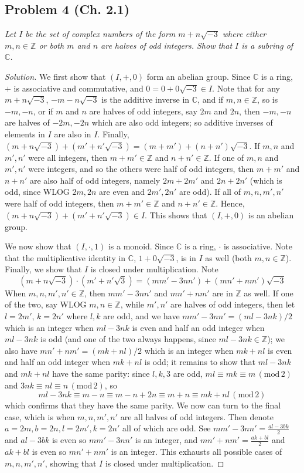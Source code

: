 \documentclass{article}
\newcommand{\Z}{{\mathbb Z}}
\newcommand{\C}{{\mathbb C}}
\begin{document}
\subsection*{Problem 4 (Ch. 2.1)}
{\it Let $I$ be the set of complex numbers of the form
$m + n\sqrt{-3}$ where either $m,n\in\Z$ or both
$m$ and $n$ are halves of odd integers.
Show that $I$ is a subring of $\C$.}
\begin{proof}[Solution]\let\qed\relax
	We first show that $(I,+,0)$ form an abelian group.
	Since $\C$ is a ring, $+$ is associative and commutative,
	and $0 = 0 + 0\sqrt{-3} \in I$.
	Note that for any $m + n\sqrt{-3}$, $-m - n\sqrt{-3}$ is the additive inverse in $\C$,
	and if $m,n \in \Z$, so is $-m,-n$,
	or if $m$ and $n$ are halves of odd integers, say $2m$ and $2n$,
	then $-m,-n$ are halves of $-2m,-2n$ which are also odd integers;
	so additive inverses of elements in $I$ are also in $I$.
	Finally, $(m + n\sqrt{-3}) + (m' + n'\sqrt{-3}) = (m + m') + (n + n')\sqrt{-3}$.
	If $m,n$ and $m',n'$ were all integers,
	then $m + m' \in \Z$ and $n + n' \in \Z$.
	If one of $m,n$ and $m',n'$ were integers,
	and so the others were half of odd integers,
	then $m + m'$ and $n + n'$ are also half of odd integers,
	namely $2m+2m'$ and $2n+2n'$
	(which is odd, since WLOG $2m,2n$ are even and $2m',2n'$ are odd).
	If all of $m,n,m',n'$ were half of odd integers,
	then $m + m' \in \Z$ and $n + n' \in \Z$.
	Hence, $(m + n\sqrt{-3}) + (m' + n'\sqrt{-3}) \in I$.
	This shows that $(I, + , 0)$ is an abelian group.

	We now show that $(I,\cdot,1)$ is a monoid.
	Since $\C$ is a ring, $\cdot$ is associative.
	Note that the multiplicative identity in $\C$,
	$1 + 0\sqrt{-3}$, is in $I$ as well (both $m,n \in \Z$).
	Finally, we show that $I$ is closed under multiplication.
	Note
	\[
		(m + n\sqrt{-3})\cdot(m' + n'\sqrt{3})
		= (mm' - 3nn') + (mn' + nm')\sqrt{-3}
	\]
	When $m,n,m',n' \in \Z$, then $mm'-3nn'$ and $mn'+nm'$
	are in $\Z$ as well.
	If one of the two, say WLOG $m,n\in\Z$, while $m',n'$ are halves of odd integers,
	then let $l = 2m'$, $k = 2n'$ where $l,k$ are odd,
	and we have $mm' - 3nn' = (ml - 3nk)/2$ which is an integer
	when $ml - 3nk$ is even and half an odd integer when $ml - 3nk$ is odd
	(and one of the two always happens, since $ml - 3nk \in \Z$);
	we also have $mn' + nm' = (mk + nl)/2$ which is an integer
	when $mk+nl$ is even and half an odd integer when $mk + nl$ is odd;
	it remains to show that $ml - 3nk$ and $mk + nl$ have the same parity:
	since $l,k,3$ are odd, $ml \equiv mk \equiv m \,(\mathrm{mod}\,2)$
	and $3nk \equiv nl \equiv n \,(\mathrm{mod}\,2)$,
	so
	\[
		ml-3nk \equiv m - n \equiv m - n + 2n \equiv m + n
		\equiv mk + nl\,(\mathrm{mod}\,2)
	\]
	which confirms that they have the same parity.
	We now can turn to the final case, which is when $m,n,m',n'$
	are all halves of odd integers.
	Then denote $a = 2m, b = 2n, l = 2m', k = 2n'$ all of which are odd.
	See $mm'-3nn' = \frac{al-3bk}{2}$ and $al-3bk$ is even so $mm'-3nn'$ is an integer,
	and $mn' + nm' = \frac{ak + bl}{2}$ and $ak + bl$ is even so $mn' + nm'$ is an integer.
	This exhausts all possible cases of $m,n,m',n'$,
	showing that $I$ is closed under multiplication.


\end{proof}
\end{document}
